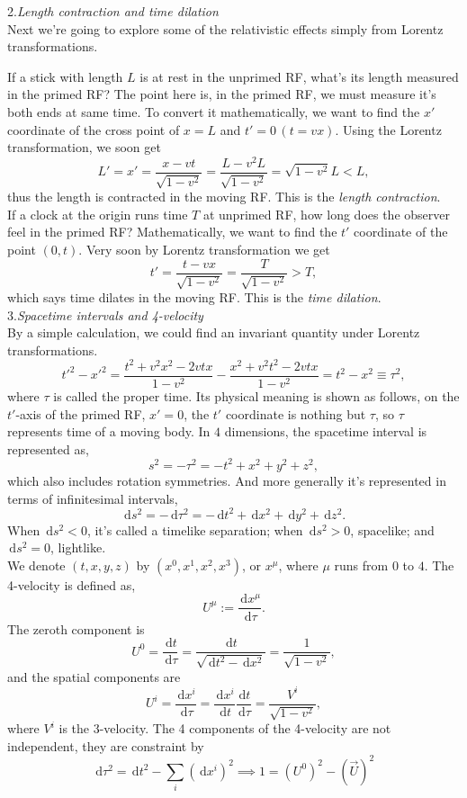 \documentclass{article}
\newcommand{\be}{\begin{equation}}
\newcommand{\ee}{\end{equation}}
\newcommand{\dif}{\,\mathrm{d}}
\newcommand{\1}{\left}
\newcommand{\2}{\right}
\newcommand{\m}{\mu}
\begin{document}
2.\textsl{Length contraction and time dilation}\\

Next we're going to explore some of the relativistic effects simply from Lorentz transformations.

If a stick with length $L$ is at rest in the unprimed RF, what's its length measured in the primed RF?
The point here is, in the primed RF, we must measure it's both ends at same time. To convert it mathematically, we want to find the $x'$ coordinate of the cross point of $x=L$ and $t'=0\,(t=vx)$.
Using the Lorentz transformation, we soon get
\be
L'=x'=\frac{x-vt}{\sqrt{1-v^2}}=\frac{L-v^2 L}{\sqrt{1-v^2}}=\sqrt{1-v^2} L<L,
\ee
thus the length is contracted in the moving RF. This is the \textit{length contraction}. \\

If a clock at the origin runs time $T$ at unprimed RF, how long does the observer feel in the primed RF?
Mathematically, we want to find the $t'$ coordinate of the point $(0, t)$.
Very soon by Lorentz transformation we get
\be
t'=\frac{t-vx}{\sqrt{1-v^2}}=\frac{T}{\sqrt{1-v^2}}>T,
\ee
which says time dilates in the moving RF. This is the \textit{time dilation}.\\

3.\textsl{Spacetime intervals and 4-velocity}\\

By a simple calculation, we could find an invariant quantity under Lorentz transformations.
\be
t'^2-x'^2=\frac{t^2+v^2x^2-2vtx}{1-v^2}-\frac{x^2+v^2t^2-2vtx}{1-v^2}=t^2-x^2\equiv\tau^2,
\ee
where $\tau$ is called the proper time. Its physical meaning is shown as follows, on the $t'$-axis of the primed RF, $x'=0$, the $t'$ coordinate is nothing but $\tau$, so $\tau$ represents time of a moving body. In $4$ dimensions, the spacetime interval is represented as,
\be
s^2=-\tau^2=-t^2+x^2+y^2+z^2,
\ee
which also includes rotation symmetries. And more generally it's represented in terms of infinitesimal intervals,
\be
\dif s^2=-\dif \tau^2=-\dif t^2+\dif x^2+\dif y^2+\dif z^2.
\ee
When $\dif s^2<0$, it's called a timelike separation; when $\dif s^2>0$, spacelike; and $\dif s^2=0$, lightlike.\\

We denote $(t,x,y,z)$ by $(x^0, x^1,x^2,x^3)$, or $x^\m$, where $\m$ runs from $0$ to $4$. The 4-velocity is defined as,
\be
U^\m:=\frac{\dif x^\m}{\dif\tau}.
\ee
The zeroth component is
\be
U^0=\frac{\dif t}{\dif\tau}=\frac{\dif t}{\sqrt{\dif t^2-\dif x^2}}=\frac{1}{\sqrt{1-v^2}},
\ee
and the spatial components are
\be
U^i=\frac{\dif x^i}{\dif \tau}=\frac{\dif x^i}{\dif t} \frac{\dif t}{\dif\tau}=\frac{V^i}{\sqrt{1-v^2}},
\ee
where $V^i$ is the 3-velocity.
The 4 components of the 4-velocity are not independent, they are constraint by
\be
\dif\tau^2=\dif t^2-\sum_i(\dif x^i)^2 \implies 1=(U^0)^2-(\vec U)^2
\ee
\end{document}
